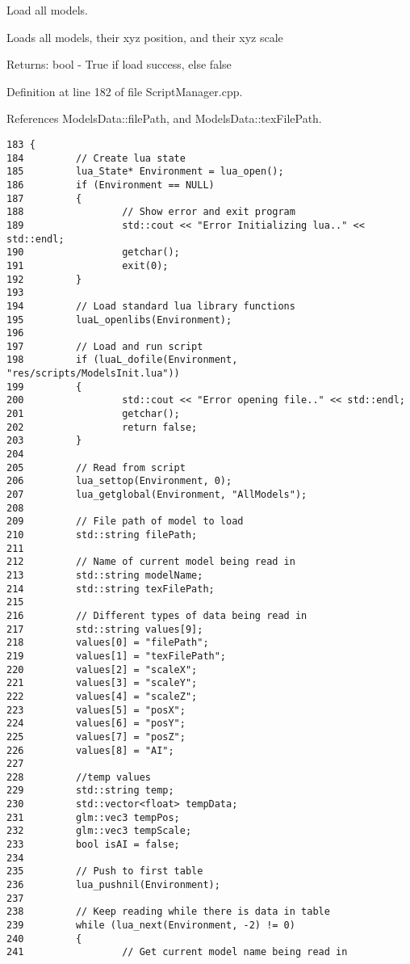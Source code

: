 Load all models. 

Loads all models, their xyz position, and their xyz scale

\begin{Desc}
\item[Returns:]bool - True if load success, else false \end{Desc}


Definition at line 182 of file ScriptManager.cpp.

References ModelsData::filePath, and ModelsData::texFilePath.

\begin{Code}\begin{verbatim}183 {
184         // Create lua state
185         lua_State* Environment = lua_open();
186         if (Environment == NULL)
187         {
188                 // Show error and exit program
189                 std::cout << "Error Initializing lua.." << std::endl;
190                 getchar();
191                 exit(0);
192         }
193 
194         // Load standard lua library functions
195         luaL_openlibs(Environment);
196 
197         // Load and run script
198         if (luaL_dofile(Environment, "res/scripts/ModelsInit.lua"))
199         {
200                 std::cout << "Error opening file.." << std::endl;
201                 getchar();
202                 return false;
203         }
204 
205         // Read from script
206         lua_settop(Environment, 0);
207         lua_getglobal(Environment, "AllModels");
208 
209         // File path of model to load
210         std::string filePath;
211 
212         // Name of current model being read in
213         std::string modelName;
214         std::string texFilePath;
215 
216         // Different types of data being read in
217         std::string values[9];
218         values[0] = "filePath";
219         values[1] = "texFilePath";
220         values[2] = "scaleX";
221         values[3] = "scaleY";
222         values[4] = "scaleZ";
223         values[5] = "posX";
224         values[6] = "posY";
225         values[7] = "posZ";
226         values[8] = "AI";
227 
228         //temp values
229         std::string temp;
230         std::vector<float> tempData;
231         glm::vec3 tempPos;
232         glm::vec3 tempScale;
233         bool isAI = false;
234 
235         // Push to first table
236         lua_pushnil(Environment);
237 
238         // Keep reading while there is data in table
239         while (lua_next(Environment, -2) != 0)
240         {
241                 // Get current model name being read in

\end{verbatim}
\end{Code}
